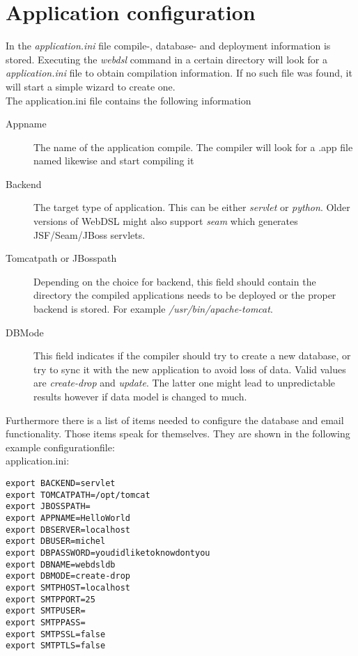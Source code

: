 \section{Application configuration} 
In the \emph{application.ini} file compile-, database- and deployment information is stored. Executing the \emph{webdsl} command in a certain directory will look for a \emph{application.ini} file to obtain compilation information. If no such file was found, it will start a simple wizard to create one. 
\\
The application.ini file contains the following information
\begin{description}
	\item[Appname]The name of the application compile. The compiler will look for a .app file named likewise and start compiling it
	\item[Backend]The target type of application. This can be either \emph{servlet} or \emph{python}. Older versions of WebDSL might also support \emph{seam} which generates JSF/Seam/JBoss servlets. 
	\item[Tomcatpath or JBosspath] Depending on the choice for backend, this field should contain the directory the compiled applications needs to be deployed or the proper backend is stored. For example \emph{/usr/bin/apache-tomcat}.
	\item[DBMode]This field indicates if the compiler should try to create a new database, or try to sync it with the new application to avoid loss of data. Valid values are \emph{create-drop} and \emph{update}. The latter one might lead to unpredictable results however if data model is changed to much. 
\end{description}
Furthermore there is a list of items needed to configure the database and email functionality. Those items speak for themselves. They are shown in the following example configurationfile:
\\application.ini:
\begin{lstlisting}
export BACKEND=servlet
export TOMCATPATH=/opt/tomcat
export JBOSSPATH=
export APPNAME=HelloWorld
export DBSERVER=localhost
export DBUSER=michel
export DBPASSWORD=youdidliketoknowdontyou
export DBNAME=webdsldb
export DBMODE=create-drop
export SMTPHOST=localhost
export SMTPPORT=25
export SMTPUSER=
export SMTPPASS=
export SMTPSSL=false
export SMTPTLS=false
\end{lstlisting}

